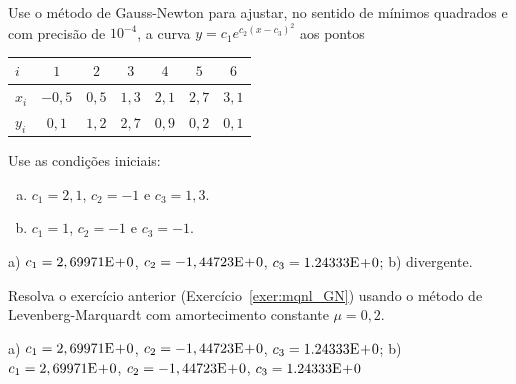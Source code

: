 \begin{exer}\label{exer:mqnl_GN}
  Use o método de Gauss-Newton para ajustar, no sentido de mínimos quadrados e com precisão de $10^{-4}$, a curva $y = c_1e^{c_2(x-c_3)^2}$ aos pontos
  \begin{center}
    \begin{tabular}{l|cccccc}
      $i$ & $1$ & $2$ & $3$ & $4$ & $5$ & $6$ \\\hline
      $x_i$ & $-0,5$ & $0,5$ & $1,3$ & $2,1$ & $2,7$ & $3,1$ \\
      $y_i$ & $0,1$ & $1,2$ & $2,7$ & $0,9$ & $0,2$ & $0,1$ \\\hline
    \end{tabular}
  \end{center}
Use as condições iniciais:
\begin{enumerate}[a)]
\item $c_1 = 2,1$, $c_2=-1$ e $c_3=1,3$.
\item $c_1=1$, $c_2=-1$ e $c_3=-1$.
\end{enumerate}
\end{exer}
\begin{resp}
  a) $c_1 = 2,69971\mathrm{E}\!+\!0$, $c_2 = -1,44723\mathrm{E}\!+\!0$, $c_3 = 1.24333\mathrm{E}\!+\!0$; b) divergente.
\end{resp}

\begin{exer}
  Resolva o exercício anterior (Exercício~\ref{exer:mqnl_GN}) usando o método de Levenberg-Marquardt com amortecimento constante $\mu=0,2$.
\end{exer}
\begin{resp}
  a)  $c_1 = 2,69971\mathrm{E}\!+\!0$, $c_2 = -1,44723\mathrm{E}\!+\!0$, $c_3 = 1.24333\mathrm{E}\!+\!0$; b) $c_1 = 2,69971\mathrm{E}\!+\!0$, $c_2 = -1,44723\mathrm{E}\!+\!0$, $c_3 = 1.24333\mathrm{E}\!+\!0$
\end{resp}
